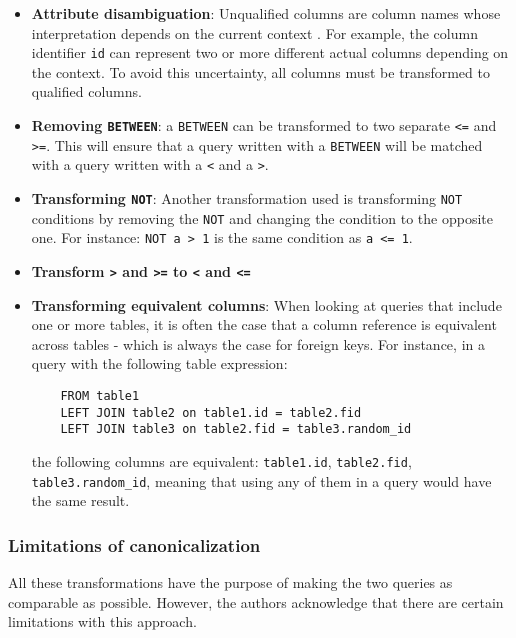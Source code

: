\begin{itemize}
    \item \textbf{Attribute disambiguation}: Unqualified columns are column names whose interpretation depends on the current context \citep{mysql:documentation}. For example, the column identifier \texttt{id} can represent two or more different actual columns depending on the context. To avoid this uncertainty, all columns must be transformed to qualified columns.
    \item \textbf{Removing \texttt{BETWEEN}}: a \texttt{BETWEEN} can be transformed to two separate \texttt{<=} and \texttt{>=}. This will ensure that a query written with a \texttt{BETWEEN} will be matched with a query written with a \texttt{<} and a \texttt{>}.
    \item \textbf{Transforming \texttt{NOT}}: Another transformation used is transforming \texttt{NOT} conditions by removing the \texttt{NOT} and changing the condition to the opposite one. For instance: \texttt{NOT a > 1} is the same condition as \texttt{a <= 1}.
    \item \textbf{Transform \texttt{>} and \texttt{>=} to \texttt{<} and \texttt{<=}}
    \item \textbf{Transforming equivalent columns}: When looking at queries that include one or more tables, it is often the case that a column reference is equivalent across tables - which is always the case for foreign keys. For instance, in a query with the following table expression: \begin{verbatim}
    FROM table1
    LEFT JOIN table2 on table1.id = table2.fid
    LEFT JOIN table3 on table2.fid = table3.random_id
    \end{verbatim}
    the following columns are equivalent: \texttt{table1.id}, \texttt{table2.fid}, \texttt{table3.random_id}, meaning that using any of them in a query would have the same result.
\end{itemize}

\subsubsection{Limitations of canonicalization} \label{ch:lit:sec:can:subsec:limit}

All these transformations have the purpose of making the two queries as comparable as possible. However, the authors acknowledge that there are certain limitations with this approach.

